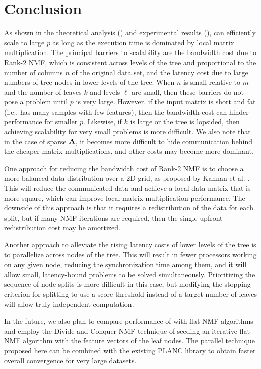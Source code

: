 
\section{Conclusion}

As shown in the theoretical analysis () and experimental results (),  can efficiently scale to large $p$ as long as the execution time is dominated by local matrix multiplication.
The principal barriers to scalability are the bandwidth cost due to Rank-2 NMF, which is consistent across levels of the tree and proportional to the number of columns $n$ of the original data set, and the latency cost due to large numbers of tree nodes in lower levels of the tree.
When $n$ is small relative to $m$ and the number of leaves $k$ and levels $\ell$ are small, then these barriers do not pose a problem until $p$ is very large.
However, if the input matrix is short and fat (i.e., has many samples with few features), then the bandwidth cost can hinder performance for smaller $p$.
Likewise, if $k$ is large or the tree is lopsided, then achieving scalability for very small problems is more difficult.
We also note that in the case of sparse $\M{A}$, it becomes more difficult to hide communication behind the cheaper matrix multiplications, and other costs may become more dominant.

One approach for reducing the bandwidth cost of Rank-2 NMF is to choose a more balanced data distribution over a 2D grid, as proposed by Kannan et al. \cite{KBP16}.
This will reduce the communicated data and achieve a local data matrix that is more square, which can improve local matrix multiplication performance.
The downside of this approach is that it requires a redistribution of the data for each split, but if many NMF iterations are required, then the single upfront redistribution cost may be amortized.

Another approach to alleviate the rising latency costs of lower levels of the tree is to parallelize across nodes of the tree.
This will result in fewer processors working on any given node, reducing the synchronization time among them, and it will allow small, latency-bound problems to be solved simultaneously.
Prioritizing the sequence of node splits is more difficult in this case, but modifying the stopping criterion for splitting to use a score threshold instead of a target number of leaves will allow truly independent computation.

In the future, we also plan to compare performance of  with flat NMF algorithms and employ the Divide-and-Conquer NMF technique \cite{DKDP17} of seeding an iterative flat NMF algorithm with the feature vectors of the leaf nodes.
The parallel technique proposed here can be combined with the existing PLANC library \cite{EH+19-TR} to obtain faster overall convergence for very large datasets.
